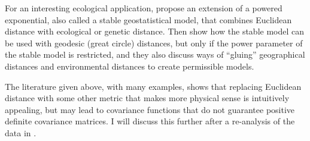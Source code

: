 \documentclass[11pt, titlepage]{article}\usepackage[]{graphicx}\usepackage[]{color}
\begin{document}
\begin{spacing}{1.9}
\begin{flushleft}
For an interesting ecological application, \citet{Brad:Ralp:Coop:dise:2013} propose an extension of a powered exponential, also called a stable geostatistical model, that combines Euclidean distance with ecological or genetic distance. Then \citet{Guil:Schi:Porc:Bevi:vali:2014} show how the stable model can be used with geodesic (great circle) distances, but only if the power parameter of the stable model is restricted, and they also discuss ways of ``gluing'' geographical distances and environmental distances to create permissible models.

The literature given above, with many examples, shows that replacing Euclidean distance with some other metric that makes more physical sense is intuitively appealing, but may lead to covariance functions that do not guarantee positive definite covariance matrices. I will discuss this further after a re-analysis of the data in \citet{Ladl:Avga:Whea:Boyc:pred:2016}. 















\end{flushleft}
\end{spacing}
\end{document}
